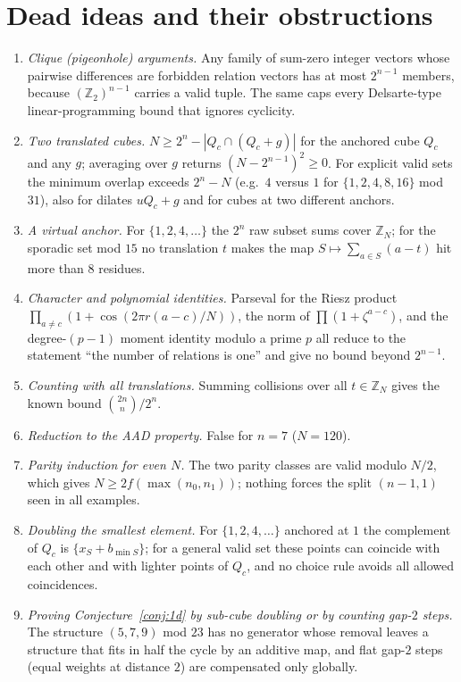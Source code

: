 \documentclass[11pt]{article}
\theoremstyle{definition}
\newcommand{\Z}{\mathbb{Z}}
\newcommand{\ZN}{\Z_N}
\begin{document}
\section{Dead ideas and their obstructions}
\begin{enumerate}
\item \emph{Clique (pigeonhole) arguments.} Any family of sum-zero integer vectors whose pairwise differences are forbidden relation vectors has at most $2^{n-1}$ members, because $(\Z_2)^{n-1}$ carries a valid tuple. The same caps every Delsarte-type linear-programming bound that ignores cyclicity.
\item \emph{Two translated cubes.} $N\ge 2^n-|Q_c\cap(Q_c+g)|$ for the anchored cube $Q_c$ and any $g$; averaging over $g$ returns $(N-2^{n-1})^2\ge0$. For explicit valid sets the minimum overlap exceeds $2^n-N$ (e.g.\ $4$ versus $1$ for $\{1,2,4,8,16\}$ mod $31$), also for dilates $uQ_c+g$ and for cubes at two different anchors.
\item \emph{A virtual anchor.} For $\{1,2,4,\dots\}$ the $2^n$ raw subset sums cover $\ZN$; for the sporadic set mod $15$ no translation $t$ makes the map $S\mapsto\sum_{a\in S}(a-t)$ hit more than $8$ residues.
\item \emph{Character and polynomial identities.} Parseval for the Riesz product $\prod_{a\ne c}(1+\cos(2\pi r(a-c)/N))$, the norm of $\prod(1+\zeta^{a-c})$, and the degree-$(p-1)$ moment identity modulo a prime $p$ all reduce to the statement ``the number of relations is one'' and give no bound beyond $2^{n-1}$.
\item \emph{Counting with all translations.} Summing collisions over all $t\in\ZN$ gives the known bound $\binom{2n}{n}/2^n$.
\item \emph{Reduction to the AAD property.} False for $n=7$ ($N=120$).
\item \emph{Parity induction for even $N$.} The two parity classes are valid modulo $N/2$, which gives $N\ge 2f(\max(n_0,n_1))$; nothing forces the split $(n-1,1)$ seen in all examples.
\item \emph{Doubling the smallest element.} For $\{1,2,4,\dots\}$ anchored at $1$ the complement of $Q_c$ is $\{x_S+b_{\min S}\}$; for a general valid set these points can coincide with each other and with lighter points of $Q_c$, and no choice rule avoids all allowed coincidences.
\item \emph{Proving Conjecture~\ref{conj:1d} by sub-cube doubling or by counting gap-$2$ steps.} The structure $(5,7,9)$ mod $23$ has no generator whose removal leaves a structure that fits in half the cycle by an additive map, and flat gap-$2$ steps (equal weights at distance $2$) are compensated only globally.
\end{enumerate}
\end{document}
